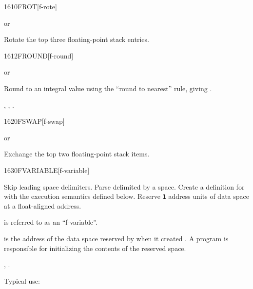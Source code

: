 \begin{worddef}{1610}{FROT}[f-rote]
\item {} or

	Rotate the top three floating-point stack entries.
\end{worddef}


\begin{worddef}{1612}{FROUND}[f-round]
\item {} or

	Round  to an integral value using the ``round to nearest''
	rule, giving .

\see {},
	, .
\end{worddef}


\vspace*{-0.5ex}
\begin{worddef}{1620}{FSWAP}[f-swap]
\item {} or

	Exchange the top two floating-point stack items.
\end{worddef}


\vspace*{-0.5ex}
\begin{worddef}{1630}{FVARIABLE}[f-variable]
\item {}

	Skip leading space delimiters. Parse  delimited by a
	space. Create a definition for  with the execution
	semantics defined below. Reserve \texttt{1} 
	address units of data space at a float-aligned address.

	 is referred to as an ``f-variable''.

\execute[name]

	 is the address of the data space reserved by
	 when it created . A program is
	responsible for initializing the contents of the reserved
	space.

\see {},
	.

	\begin{rationale} %
		Typical use:
			 
	\end{rationale}
\end{worddef}

